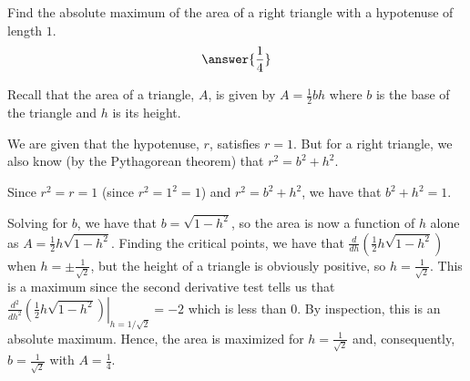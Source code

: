 \documentclass{ximera}
\author{Gregory Hartman \and Matthew Carr}
\begin{document}
\begin{exercise}



Find the absolute maximum of the area of a right triangle with a hypotenuse of length $1$. \[\answer{\frac{1}{4}}\]
\begin{hint}
Recall that the area of a triangle, $A$, is given by $A=\frac{1}{2}bh$ where $b$ is the base of the triangle and $h$ is its height.
\end{hint}
\begin{hint}
We are given that the hypotenuse, $r$, satisfies $r=1$. But for a right triangle, we also know (by the Pythagorean theorem) that $r^2=b^2+h^2$.
\end{hint}
\begin{hint}
Since $r^2=r=1$ (since $r^2=1^2=1$) and $r^2=b^2+h^2$, we have that $b^2+h^2=1$. 
\end{hint}
\begin{hint}
Solving for $b$, we have that $b=\sqrt{1-h^2}$, so the area is now a function of $h$ alone as $A=\frac{1}{2}h\sqrt{1-h^2}$. Finding the critical points, we have that $\frac{d}{dh}(\frac{1}{2}h\sqrt{1-h^2})$ when $h=\pm\frac{1}{\sqrt{2}}$, but the height of a triangle is obviously positive, so $h=\frac{1}{\sqrt{2}}$. This is a maximum since the second derivative test tells us that $\left.\frac{d^2}{dh^2}(\frac{1}{2}h\sqrt{1-h^2})\right|_{h=1/\sqrt{2}}=-2$ which is less than $0$. By inspection, this is an absolute maximum. Hence, the area is maximized for $h=\frac{1}{\sqrt{2}}$ and, consequently, $b=\frac{1}{\sqrt{2}}$ with $A=\frac{1}{4}$.
\end{hint}

\end{exercise}
\end{document}

